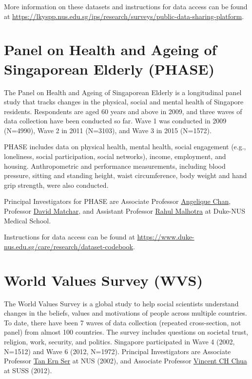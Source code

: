 \documentclass[
  openany]{book}
\begin{document}
More information on these datasets and instructions for data access can be found at \url{https://lkyspp.nus.edu.sg/ips/research/surveys/public-data-sharing-platform}.

\hypertarget{phase}{%
\section{Panel on Health and Ageing of Singaporean Elderly (PHASE)}\label{phase}}

The Panel on Health and Ageing of Singaporean Elderly is a longitudinal panel study that tracks changes in the physical, social and mental health of Singapore residents. Respondents are aged 60 years and above in 2009, and three waves of data collection have been conducted so far. Wave 1 was conducted in 2009 (N=4990), Wave 2 in 2011 (N=3103), and Wave 3 in 2015 (N=1572).

PHASE includes data on physical health, mental health, social engagement (e.g., loneliness, social participation, social networks), income, employment, and housing. Anthropometric and performance measurements, including blood pressure, sitting and standing height, waist circumference, body weight and hand grip strength, were also conducted.

Principal Investigators for PHASE are Associate Professor \href{https://www.duke-nus.edu.sg/hssr/our-team/faculty/faculty-staff-details/Detail/13200}{Angelique Chan}, Professor \href{https://www.duke-nus.edu.sg/hssr/our-team/faculty/faculty-staff-details/Detail/31920}{David Matchar}, and Assistant Professor \href{https://www.duke-nus.edu.sg/hssr/our-team/faculty/faculty-staff-details/Detail/30743}{Rahul Malhotra} at Duke-NUS Medical School.

Instructions for data access can be found at \url{https://www.duke-nus.edu.sg/care/research/dataset-codebook}.

\hypertarget{wvs}{%
\section{World Values Survey (WVS)}\label{wvs}}

The World Values Survey is a global study to help social scientists understand changes in the beliefs, values and motivations of people across multiple countries. To date, there have been 7 waves of data collection (repeated cross-section, not panel) from almost 100 countries. The survey includes questions on societal trust, religion, work, security, and politics. Singapore participated in Wave 4 (2002, N=1512) and Wave 6 (2012, N=1972). Principal Investigators are Associate Professor \href{http://profile.nus.edu.sg/fass/soctanes/}{Tan Ern Ser} at NUS (2002), and Associate Professor \href{https://www.suss.edu.sg/about-suss/faculty-and-staff/detail/vincent-chua}{Vincent CH Chua} at SUSS (2012).
\end{document}
